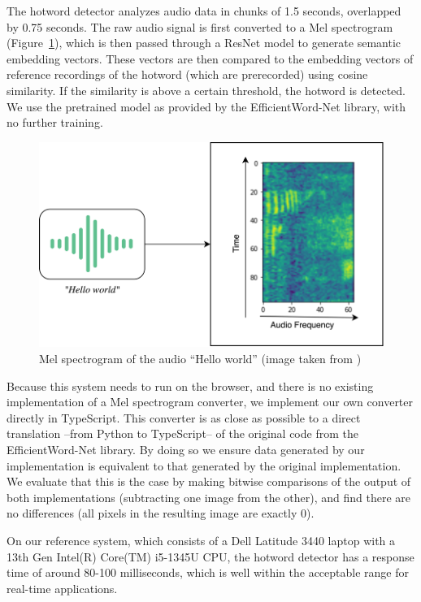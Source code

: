 \documentclass[a4paper,12pt,twoside]{ThesisStyle}
\begin{document}
The hotword detector analyzes audio data in chunks of 1.5 seconds, overlapped by 0.75 seconds. The raw audio signal is first converted to a Mel spectrogram (Figure~\ref{fig:mel_spectrogram}), which is then passed through a ResNet \cite{He2015DeepResidualLearningImage} model to generate semantic embedding vectors. These vectors are then compared to the embedding vectors of reference recordings of the hotword (which are prerecorded) using cosine similarity. If the similarity is above a certain threshold, the hotword is detected.
We use the pretrained model as provided by the EfficientWord-Net library, with no further training.

\begin{figure}[htb]
  \centering
  \includegraphics[width=1\textwidth]{imatges/MelSpectrogram.png}
  \caption{Mel spectrogram of the audio ``Hello world'' (image taken from \cite{Chidhambararajan2022EfficientWordNet})}
  \label{fig:mel_spectrogram}
\end{figure}

Because this system needs to run on the browser, and there is no existing implementation of a Mel spectrogram converter, we implement our own converter directly in TypeScript. This converter is as close as possible to a direct translation --from Python to TypeScript-- of the original code from the EfficientWord-Net library. By doing so we ensure data generated by our implementation is equivalent to that generated by the original implementation. We evaluate that this is the case by making bitwise comparisons of the output of both implementations (subtracting one image from the other), and find there are no differences (all pixels in the resulting image are exactly 0).

On our reference system, which consists of a Dell Latitude 3440 laptop with a 13th Gen Intel(R) Core(TM) i5-1345U CPU, the hotword detector has a response time of around 80-100 milliseconds, which is well within the acceptable range for real-time applications.
\end{document}
